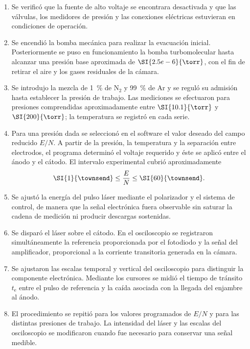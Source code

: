 \begin{enumerate}
    \item Se verificó que la fuente de alto voltaje se encontrara desactivada y que las válvulas, los medidores de presión y las conexiones eléctricas estuvieran en condiciones de operación.

    \item Se encendió la bomba mecánica para realizar la evacuación inicial. Posteriormente se puso en funcionamiento la bomba turbomolecular hasta alcanzar una presión base aproximada de $\SI{2.5e-6}{\torr}$, con el fin de retirar el aire y los gases residuales de la cámara.

    \item Se introdujo la mezcla de \SI{1}{\percent} de $\mathrm{N_2}$ y \SI{99}{\percent} de Ar y se reguló su admisión hasta establecer la presión de trabajo. Las mediciones se efectuaron para presiones comprendidas aproximadamente entre $\SI{10.1}{\torr}$ y $\SI{200}{\torr}$; la temperatura se registró en cada serie.

    \item Para una presión dada se seleccionó en el software el valor deseado del campo reducido $E/N$. A partir de la presión, la temperatura y la separación entre electrodos, el programa determinó el voltaje requerido y éste se aplicó entre el ánodo y el cátodo. El intervalo experimental cubrió aproximadamente
    \begin{equation}
        \SI{1}{\townsend} \leq \frac{E}{N} \leq \SI{60}{\townsend}.
    \end{equation}

    \item Se ajustó la energía del pulso láser mediante el polarizador y el sistema de control, de manera que la señal electrónica fuera observable sin saturar la cadena de medición ni producir descargas sostenidas.

    \item Se disparó el láser sobre el cátodo. En el osciloscopio se registraron simultáneamente la referencia proporcionada por el fotodiodo y la señal del amplificador, proporcional a la corriente transitoria generada en la cámara.

    \item Se ajustaron las escalas temporal y vertical del osciloscopio para distinguir la componente electrónica. Mediante los cursores se midió el tiempo de tránsito $t_{\mathrm e}$ entre el pulso de referencia y la caída asociada con la llegada del enjambre al ánodo.

    \item El procedimiento se repitió para los valores programados de $E/N$ y para las distintas presiones de trabajo. La intensidad del láser y las escalas del osciloscopio se modificaron cuando fue necesario para conservar una señal medible.
\end{enumerate}


